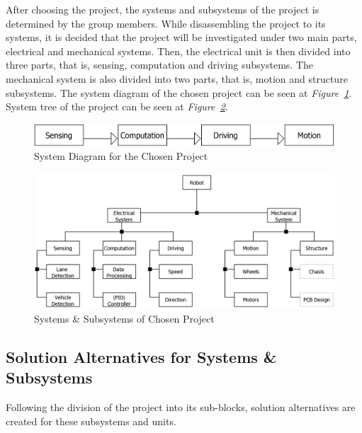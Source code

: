 \documentclass[a4paper,12pt]{article}
\begin{document}
	After choosing the project, the systems and subsystems of the project is determined by the group members. While disassembling the project to its systems, it is decided that the project will be investigated under two main parts, electrical and mechanical systems. Then, the electrical unit is then divided into three parts, that is, sensing, computation and driving subsystems. The mechanical system is also divided into two parts, that is, motion and structure subsystems. The system diagram of the chosen project can be seen at \textit{Figure~\ref{fig:system_diagram}}. System tree of the project can be seen at \textit{Figure~\ref{fig:systems_project}}.
	
	\begin{figure}[H]
		\centering
		\includegraphics[width=\textwidth,height=\textheight,keepaspectratio]{product-tree/system-flow} 
		\caption{\label{fig:system_diagram}System Diagram for the Chosen Project}
	\end{figure}
	
	
	\begin{figure}[H]
		\centering
		\includegraphics[width=\textwidth,height=\textheight,keepaspectratio]{product-tree/product-tree} 
		\caption{\label{fig:systems_project}Systems \& Subsystems of Chosen Project}
	\end{figure}

	\subsection{Solution Alternatives for Systems \& Subsystems }
	
	Following the division of the project into its sub-blocks, solution alternatives are created for these subsystems and units. 
		
\end{document}
